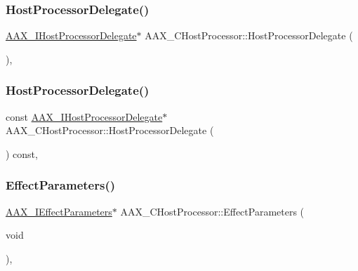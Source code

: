 \subsubsection{\texorpdfstring{HostProcessorDelegate()}{HostProcessorDelegate()}\hspace{0.1cm}{\footnotesize\ttfamily [1/2]}}
{\footnotesize\ttfamily \mbox{\hyperlink{a01837}{A\+A\+X\+\_\+\+I\+Host\+Processor\+Delegate}}$\ast$ A\+A\+X\+\_\+\+C\+Host\+Processor\+::\+Host\+Processor\+Delegate (\begin{DoxyParamCaption}{ }\end{DoxyParamCaption})\hspace{0.3cm}{\ttfamily [inline]}, {\ttfamily [protected]}}

\mbox{\label{a01485_aa2f5250cb4c41c18268d44cdb51d9fee}} 
\subsubsection{\texorpdfstring{HostProcessorDelegate()}{HostProcessorDelegate()}\hspace{0.1cm}{\footnotesize\ttfamily [2/2]}}
{\footnotesize\ttfamily const \mbox{\hyperlink{a01837}{A\+A\+X\+\_\+\+I\+Host\+Processor\+Delegate}}$\ast$ A\+A\+X\+\_\+\+C\+Host\+Processor\+::\+Host\+Processor\+Delegate (\begin{DoxyParamCaption}{ }\end{DoxyParamCaption}) const\hspace{0.3cm}{\ttfamily [inline]}, {\ttfamily [protected]}}

\mbox{\label{a01485_aa4814b762825385280f69ed71949ac48}} 
\subsubsection{\texorpdfstring{EffectParameters()}{EffectParameters()}\hspace{0.1cm}{\footnotesize\ttfamily [1/2]}}
{\footnotesize\ttfamily \mbox{\hyperlink{a01825}{A\+A\+X\+\_\+\+I\+Effect\+Parameters}}$\ast$ A\+A\+X\+\_\+\+C\+Host\+Processor\+::\+Effect\+Parameters (\begin{DoxyParamCaption}\item[{void}]{ }\end{DoxyParamCaption})\hspace{0.3cm}{\ttfamily [inline]}, {\ttfamily [protected]}}

